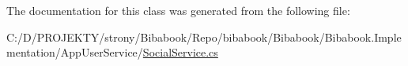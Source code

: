 The documentation for this class was generated from the following file\+:\begin{DoxyCompactItemize}
\item 
C\+:/\+D/\+P\+R\+O\+J\+E\+K\+T\+Y/strony/\+Bibabook/\+Repo/bibabook/\+Bibabook/\+Bibabook.\+Implementation/\+App\+User\+Service/\hyperlink{_social_service_8cs}{Social\+Service.\+cs}\end{DoxyCompactItemize}
